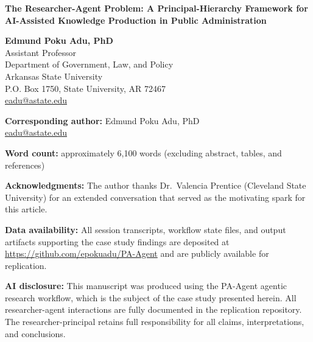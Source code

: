 \documentclass[12pt]{article}
\date{}
\author{}
\begin{document}
\begin{center}

\vspace*{1.5cm}

{\LARGE\textbf{The Researcher-Agent Problem: A Principal-Hierarchy Framework for
AI-Assisted Knowledge Production in Public Administration}}

\vspace{1.5cm}

\textbf{Edmund Poku Adu, PhD}\\[4pt]
Assistant Professor\\
Department of Government, Law, and Policy\\
Arkansas State University\\
P.O. Box 1750, State University, AR 72467\\
\href{mailto:eadu@astate.edu}{eadu@astate.edu}

\vspace{2cm}

\textbf{Corresponding author:} Edmund Poku Adu, PhD\\
\href{mailto:eadu@astate.edu}{eadu@astate.edu}

\vspace{2cm}

\textbf{Word count:} approximately 6,100 words (excluding abstract, tables, and references)

\vspace{1cm}

\textbf{Acknowledgments:} The author thanks Dr.\ Valencia Prentice (Cleveland State
University) for an extended conversation that served as the motivating spark for this
article.

\vspace{1cm}

\textbf{Data availability:} All session transcripts, workflow state files, and output
artifacts supporting the case study findings are deposited at
\url{https://github.com/epokuadu/PA-Agent} and are publicly available for replication.

\vspace{1cm}

\textbf{AI disclosure:} This manuscript was produced using the PA-Agent agentic research
workflow, which is the subject of the case study presented herein. All researcher-agent
interactions are fully documented in the replication repository. The researcher-principal
retains full responsibility for all claims, interpretations, and conclusions.

\end{center}
\end{document}
